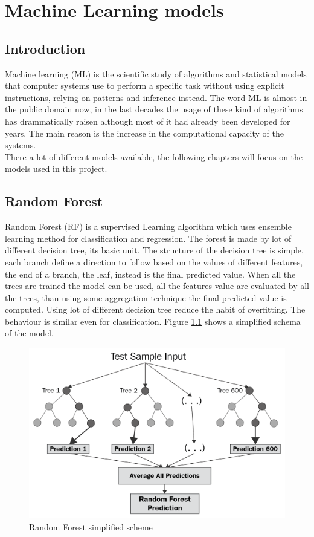 \documentclass[%
    corpo=12pt,
    twoside,
    oldstyle,
    autoretitolo,
    greek,
    evenboxes,
]{toptesi}
\begin{document}

\chapter{Machine Learning models}
\section{Introduction}
Machine learning (ML) is the scientific study of algorithms and statistical models that computer systems use to perform a specific task without using explicit instructions, relying on patterns and inference instead\cite{ml}. The word ML is almost in the public domain now, in the last decades the usage of these kind of algorithms has drammatically raisen although most of it had already been developed for years. The main reason is the increase in the computational capacity of the systems.\\
There a lot of different models available, the following chapters will focus on the models used in this project.

\section{Random Forest}
Random Forest (RF) is a supervised Learning algorithm which uses ensemble learning method for classification and regression. The forest is made by lot of different decision tree, its basic unit. The structure of the decision tree is simple, each branch define a direction to follow based on the values of different features, the end of a branch, the leaf, instead is the final predicted value. When all the trees are trained the model can be used, all the features value are evaluated by all the trees, than using some aggregation technique the final predicted value is computed. Using lot of different decision tree reduce the habit of overfitting. The behaviour is similar even for classification. Figure \ref{fig:rf} shows a simplified schema of the model.
\begin{figure}[!h]
  \includegraphics[width=\linewidth]{figure/rf.png}
  \caption{Random Forest simplified scheme \cite{rf}}
  \label{fig:rf}
\end{figure}
\end{document}
